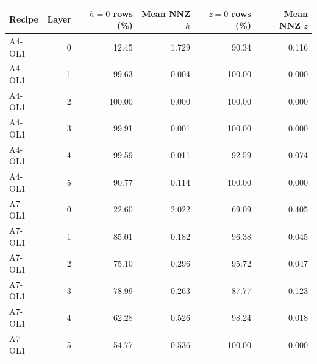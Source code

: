 \begin{tabular}{@{}lrrrrr@{}}
\toprule
Recipe & Layer & $h=0$ rows (\%) & Mean NNZ $h$ & $z=0$ rows (\%) & Mean NNZ $z$ \\
\midrule
A4-OL1 & 0 & 12.45 & 1.729 & 90.34 & 0.116 \\
A4-OL1 & 1 & 99.63 & 0.004 & 100.00 & 0.000 \\
A4-OL1 & 2 & 100.00 & 0.000 & 100.00 & 0.000 \\
A4-OL1 & 3 & 99.91 & 0.001 & 100.00 & 0.000 \\
A4-OL1 & 4 & 99.59 & 0.011 & 92.59 & 0.074 \\
A4-OL1 & 5 & 90.77 & 0.114 & 100.00 & 0.000 \\
A7-OL1 & 0 & 22.60 & 2.022 & 69.09 & 0.405 \\
A7-OL1 & 1 & 85.01 & 0.182 & 96.38 & 0.045 \\
A7-OL1 & 2 & 75.10 & 0.296 & 95.72 & 0.047 \\
A7-OL1 & 3 & 78.99 & 0.263 & 87.77 & 0.123 \\
A7-OL1 & 4 & 62.28 & 0.526 & 98.24 & 0.018 \\
A7-OL1 & 5 & 54.77 & 0.536 & 100.00 & 0.000 \\
\bottomrule
\end{tabular}
